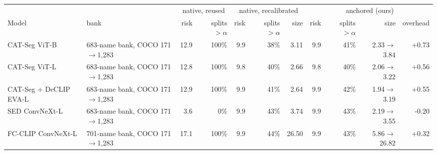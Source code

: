 \begin{tabular}{@{}llrrrrrrrrr@{}}
\toprule
& & \multicolumn{2}{c}{native, reused} & \multicolumn{3}{c}{native, recalibrated} & \multicolumn{4}{c}{anchored (ours)} \\
\cmidrule(lr){3-4}\cmidrule(lr){5-7}\cmidrule(lr){8-11}
Model & bank & risk & splits $>\alpha$ & risk & splits $>\alpha$ & size & risk & splits $>\alpha$ & size & overhead \\
\midrule
CAT-Seg ViT-B & 683-name bank, COCO 171$\to$1,283 & 12.9 & 100\% & 9.9 & 38\% & 3.11 & 9.9 & 41\% & 2.33$\to$3.84 & +0.73 \\
CAT-Seg ViT-L & 683-name bank, COCO 171$\to$1,283 & 12.8 & 100\% & 9.8 & 40\% & 2.66 & 9.8 & 40\% & 2.06$\to$3.22 & +0.56 \\
CAT-Seg + DeCLIP EVA-L & 683-name bank, COCO 171$\to$1,283 & 12.9 & 100\% & 9.9 & 41\% & 2.64 & 9.9 & 42\% & 1.94$\to$3.19 & +0.55 \\
SED ConvNeXt-L & 683-name bank, COCO 171$\to$1,283 & 3.6 & 0\% & 9.9 & 43\% & 3.74 & 9.9 & 43\% & 2.19$\to$3.55 & -0.20 \\
FC-CLIP ConvNeXt-L & 701-name bank, COCO 171$\to$1,283 & 17.1 & 100\% & 9.9 & 44\% & 26.50 & 9.9 & 43\% & 5.86$\to$26.82 & +0.32 \\
\bottomrule
\end{tabular}
